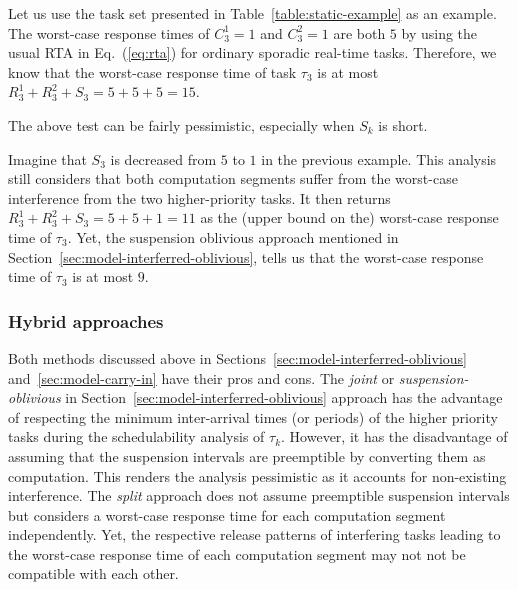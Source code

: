 \begin{example}
\label{ex:suspension-as-split-1}   
Let us use the task set presented in Table~\ref{table:static-example} as an example. The worst-case response times of $C_3^1=1$ and $C_3^2=1$ are both $5$ by using the usual RTA in Eq.~(\ref{eq:rta}) for ordinary sporadic real-time tasks. Therefore, we know that the worst-case response time of task $\tau_3$ is at most $R_3^1 + R_3^2 + S_3 = 5 + 5 + 5 = 15$.
\hfill\myendproof  
\end{example}

The above test can be fairly pessimistic, especially when $S_k$ is short. 
\begin{example}
\label{ex:suspension-as-split-2}   
Imagine that $S_3$ is decreased from $5$ to $1$ in the previous example. This analysis still considers that both computation segments suffer from the worst-case interference from the two higher-priority tasks. It then returns $R_3^1 + R_3^2 + S_3 = 5 + 5 + 1 =11$ as the (upper bound on the) worst-case response time of $\tau_3$. Yet, the suspension oblivious approach mentioned in Section~\ref{sec:model-interferred-oblivious}, tells us that the worst-case response time of $\tau_3$ is at most $9$.
\hfill\myendproof  
\end{example} 

\subsubsection{Hybrid approaches}
\label{sec:model-interferred-hybrid}

Both methods discussed above in Sections~\ref{sec:model-interferred-oblivious} and~\ref{sec:model-carry-in} have their pros and cons. The \emph{joint} or \emph{suspension-oblivious} in Section~\ref{sec:model-interferred-oblivious} approach has the advantage of
respecting the minimum inter-arrival times (or periods) of the higher priority tasks during the schedulability 
analysis of $\tau_k$. However, it has the disadvantage of assuming that the suspension intervals are preemptible by converting them as computation. 
This renders the analysis pessimistic as it accounts for non-existing interference. The \emph{split} approach does not assume  
preemptible suspension intervals but  considers a worst-case response time for each computation segment independently. Yet, the respective
release patterns of interfering tasks leading to the worst-case response time of each computation segment may not not be compatible with each other.


